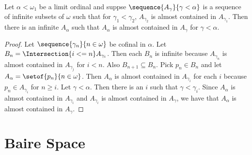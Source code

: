 \documentclass[oneside,12pt]{amsart}
\begin{document}
\begin{lemma}
Let $\alpha < \omega_1$ be a limit ordinal and suppse $\sequence{A_{\gamma}}{\gamma < \alpha}$ is a sequence of infinite
subsets of $\omega$ such that for $\gamma_1 < \gamma_2$, $A_{\gamma_2}$ is almost contained in
$A_{\gamma_1}$. Then there is an infinite $A_{\alpha}$ such that $A_{\alpha}$ is almost contained
in $A_{\gamma}$ for $\gamma<\alpha$.
\end{lemma}
\begin{proof}
Let $\sequence{\gamma_n}{n \in \omega}$ be cofinal in $\alpha$. Let $B_n = \Intersection{i<=n} A_{\gamma_i}$.
Then each $B_n$ is infinite because $A_{\gamma_n}$ is almost contained in $A_{\gamma_j}$ for $i<n$. Also $B_{n+1} \subseteq B_n$.
Pick $p_n \in B_n$ and let $A_{\alpha} = \setof{p_n}{n\in\omega}$. Then $A_{\alpha}$ is almost contained in $A_{\gamma_i}$ for each
$i$ because $p_n \in A_{\gamma_i}$ for $n \geq i$. Let $\gamma < \alpha$. Then there is an $i$ such that $\gamma < \gamma_i$.
Since $A_{\alpha}$ is almsot contained in $A_{\gamma_i}$ and $A_{\gamma_i}$ is almost contained in $A_{\gamma}$, we have that
$A_{\alpha}$ is almost contained in $A_{\gamma}$.
\end{proof}


\section{Baire Space}
\end{document}
